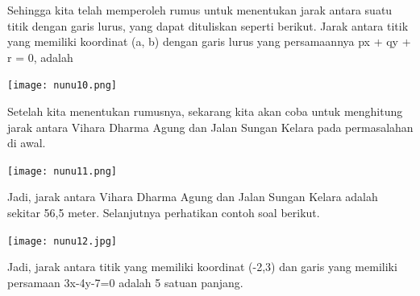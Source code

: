 \documentclass[11pt,fleqn]{book} %
\begin{document}
Sehingga kita telah memperoleh rumus untuk menentukan jarak antara suatu titik dengan garis lurus, yang dapat dituliskan seperti berikut.
Jarak antara titik yang memiliki koordinat (a, b) dengan garis lurus yang persamaannya px + qy + r = 0, adalah

\begin{center}
\texttt{[image: nunu10.png]}
\end{center}

Setelah kita menentukan rumusnya, sekarang kita akan coba untuk menghitung jarak antara Vihara Dharma Agung dan Jalan Sungan Kelara pada permasalahan di awal.

\begin{center}
\texttt{[image: nunu11.png]}
\end{center}

Jadi, jarak antara Vihara Dharma Agung dan Jalan Sungan Kelara adalah sekitar 56,5 meter. Selanjutnya perhatikan contoh soal berikut.

\texttt{[image: nunu12.jpg]}

Jadi, jarak antara titik yang memiliki koordinat (-2,3) dan garis yang memiliki persamaan 3x-4y-7=0 adalah 5 satuan panjang.
\end{document}
